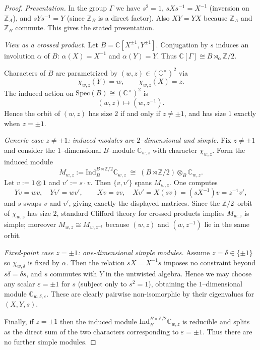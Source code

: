 \documentclass[11pt]{amsart}
\theoremstyle{remark}
\theoremstyle{definition}
\def\Spec{\mathrm{Spec}}
\def\Ind{\mathrm{Ind}}
\newcommand{\Z}{\mathbb{Z}}
\newcommand{\C}{\mathbb{C}}
\begin{document}
\begin{proof}
\emph{Presentation.}
In the group $\Gamma$ we have $s^2=1$, $sXs^{-1}=X^{-1}$ (inversion on $\Z_A$),
and $sYs^{-1}=Y$ (since $\Z_B$ is a direct factor). Also $XY=YX$ because $\Z_A$ and $\Z_B$
commute. This gives the stated presentation.

\medskip
\emph{View as a crossed product.}
Let $B=\C[X^{\pm1},Y^{\pm1}]$. Conjugation by $s$ induces an involution $\alpha$ of $B$:
$\alpha(X)=X^{-1}$ and $\alpha(Y)=Y$. Thus $\C[\Gamma]\cong B\rtimes_\alpha \Z/2$.

Characters of $B$ are parametrized by $(w,z)\in(\C^\times)^2$ via
\[
\chi_{w,z}(Y)=w,\qquad \chi_{w,z}(X)=z.
\]
The induced action on $\Spec(B)\cong(\C^\times)^2$ is
\[
(w,z)\longmapsto (w,z^{-1}).
\]
Hence the orbit of $(w,z)$ has size $2$ if and only if $z\neq \pm 1$, and has size $1$ exactly
when $z=\pm1$.

\medskip
\emph{Generic case $z\neq \pm1$: induced modules are $2$--dimensional and simple.}
Fix $z\neq \pm1$ and consider the $1$--dimensional $B$--module $\C_{w,z}$ with character $\chi_{w,z}$.
Form the induced module
\[
M_{w,z}:=\Ind_{B}^{B\rtimes\Z/2}\C_{w,z}\;\cong\; (B\rtimes\Z/2)\otimes_B \C_{w,z}.
\]
Let $v:=1\otimes 1$ and $v':=s\cdot v$. Then $\{v,v'\}$ spans $M_{w,z}$.
One computes
\[
Yv=wv,\quad Yv'=w v',\qquad
Xv=zv,\quad Xv'=X(sv)=(sX^{-1})v=z^{-1}v',
\]
and $s$ swaps $v$ and $v'$, giving exactly the displayed matrices.
Since the $\Z/2$--orbit of $\chi_{w,z}$ has size $2$, standard Clifford theory for crossed products
implies $M_{w,z}$ is simple; moreover $M_{w,z}\cong M_{w,z^{-1}}$ because $(w,z)$ and $(w,z^{-1})$
lie in the same orbit.

\medskip
\emph{Fixed-point case $z=\pm1$: one-dimensional simple modules.}
Assume $z=\delta\in\{\pm1\}$ so $\chi_{w,\delta}$ is fixed by $\alpha$.
Then the relation $sX=X^{-1}s$ imposes no constraint beyond $s\delta=\delta s$, and $s$ commutes
with $Y$ in the untwisted algebra. Hence we may choose any scalar $\varepsilon=\pm1$ for $s$
(subject only to $s^2=1$), obtaining the $1$--dimensional module $\C_{w,\delta,\varepsilon}$.
These are clearly pairwise non-isomorphic by their eigenvalues for $(X,Y,s)$.

Finally, if $z=\pm1$ then the induced module $\Ind_B^{B\rtimes\Z/2}\C_{w,z}$ is reducible and splits
as the direct sum of the two characters corresponding to $\varepsilon=\pm1$.
Thus there are no further simple modules.
\end{proof}
\end{document}
